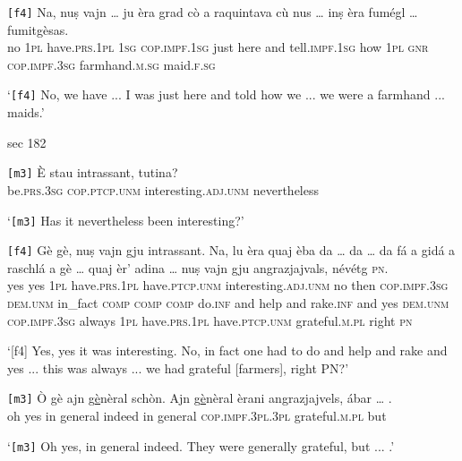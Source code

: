 \begin{linenumbers}
	\gll \texttt{[f4]} Na, nuṣ vajn … ju èra grad cò a raquintava cù nus … inṣ èra fumégl … fumitgèsas.\\
	{} no \textsc{1pl} have.\textsc{prs.1pl} {} \textsc{1sg} \textsc{cop.impf.1sg} just here and tell.\textsc{impf.1sg} how \textsc{1pl} {} \textsc{gnr} \textsc{cop.impf.3sg} farmhand.\textsc{m.sg} {} maid.\textsc{f.sg}\\
\end{linenumbers}
\medskip
\glt `\texttt{[f4]} No, we have ... I was just here and told how we ... we were a farmhand ... maids.'
\medskip

sec 182


\begin{linenumbers}
	\gll \texttt{[m3]} È stau intrassant, tutina?\\
	    {} be.\textsc{prs.3sg} \textsc{cop.ptcp.unm} interesting.\textsc{adj.unm} nevertheless \\
\end{linenumbers}
\medskip
\glt `\texttt{[m3]} Has it nevertheless been interesting?'
\medskip

\begin{linenumbers}
	\gll  \texttt{[f4]} Gè gè, nuṣ vajn gju intrassant. Na, lu èra quaj èba da … da … da fá a gidá a raschlá a gè … quaj èr’ adina … nuṣ vajn gju angrazjajvals, névétg \textsc{pn}.\\
{}	yes yes \textsc{1pl} have.\textsc{prs.1pl} have.\textsc{ptcp.unm} interesting.\textsc{adj.unm} no then \textsc{cop.impf.3sg} \textsc{dem.unm} in\_fact \textsc{comp} {} \textsc{comp} {} \textsc{comp} do.\textsc{inf} and help and rake.\textsc{inf} and yes {} \textsc{dem.unm} \textsc{cop.impf.3sg} always {} \textsc{1pl} have.\textsc{prs.1pl} have.\textsc{ptcp.unm} grateful.\textsc{m.pl} right \textsc{pn} \\
\end{linenumbers}
\medskip
\glt `[f4] Yes, yes it was interesting. No, in fact one had to do and help and rake and yes ... this was always ... we had grateful [farmers], right PN?'
\medskip

\begin{linenumbers}
	\gll \texttt{[m3]} Ò gè ajn g\underline{è}nèral schòn. Ajn g\underline{è}nèral èrani angrazjajvels, ábar … .   \\
{}	oh yes in general indeed in general \textsc{cop.impf.3pl.3pl} grateful.\textsc{m.pl}  but\\
\end{linenumbers}
\medskip
\glt `\texttt{[m3]} Oh yes, in general indeed. They were generally grateful, but ... .'
\medskip

